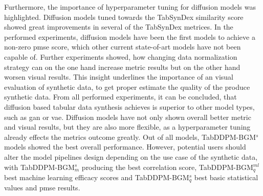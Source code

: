 Furthermore, the importance of hyperparameter tuning for diffusion models was highlighted.
Diffusion models tuned towards the TabSynDex similarity score showed great improvements in several of the TabSynDex metrices.
In the performed experiments, diffusion models have been the first models to achieve a non-zero \gls{pmse} score, which other current state-of-art models have not been capable of.
Further experiments showed, how changing data normalization strategy can on the one hand increase metric results but on the other hand worsen visual results.
This insight underlines the importance of an visual evaluation of synthetic data, to get proper estimate the quality of the produce synthetic data.
From all performed experiments, it can be concluded, that diffusion based tabular data synthesis achieves is superior to other model types, such as \gls{gan} or \gls{vae}.
Diffusion models have not only shown overall better metric and visual results, but they are also more flexible, as a hyperparameter tuning already effects the metrics outcome greatly.
Out of all models, TabDDPM-BGM$^{s}$ models showed the best overall performance.
However, potential users should alter the model pipelines design depending on the use case of the synthetic data, with TabDDPM-BGM$^{s}_m$ producing the best correlation score, TabDDPM-BGM$^{ml}_q$ best machine learning efficacy scores and TabDDPM-BGM$^{s}_q$ best basic statistical values and \gls{pmse} results.

